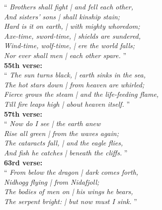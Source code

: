 ``\emph{
Brothers shall fight | and fell each other, \\
And sisters' sons | shall kinship stain; \\
Hard is it on earth, | with mighty whoredom; \\
Axe-time, sword-time, | shields are sundered, \\
Wind-time, wolf-time, | ere the world falls; \\
Nor ever shall men | each other spare.
}'' \\
\textbf{55th verse:}\\
``\emph{
The sun turns black, | earth sinks in the sea, \\
The hot stars down | from heaven are whirled; \\
Fierce grows the steam | and the life-feeding flame, \\
Till fire leaps high | about heaven itself. 
}'' \\
\textbf{57th verse:}\\
``\emph{
Now do I see | the earth anew \\
Rise all green | from the waves again; \\
The cataracts fall, | and the eagle flies, \\
And fish he catches | beneath the cliffs.
}'' \\
\textbf{63rd verse:}\\
``\emph{
From below the dragon | dark comes forth, \\
Nidhogg flying | from Nidafjoll; \\
The bodies of men on | his wings he bears, \\
The serpent bright: | but now must I sink. 
}''
